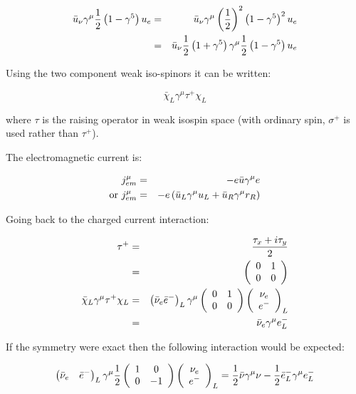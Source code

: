 \begin{eqnarray*}
  \bar{u}_{\nu}\gamma^{\mu}\frac{1}{2}\left(1 - \gamma^5\right)u_{e} & = & \bar{u}_{\nu}\gamma^{\mu}\left(\frac{1}{2}\right)^2\left(1 - \gamma^5\right)^2u_{e} \\
  & = & \bar{u}_{\nu}\frac{1}{2}\left(1 + \gamma^5\right)\gamma^{\mu}\frac{1}{2}\left(1 - \gamma^5\right)u_{e}
\end{eqnarray*}

Using the two component weak iso-spinors it can be written:

\[
  \bar{\chi}_L \gamma^{\mu}\tau^+\chi_L
\]

where $\tau$ is the raising operator in weak isospin space (with ordinary spin, $\sigma^+$ is used rather than $\tau^+$).

The electromagnetic current is:

\begin{eqnarray*}
  j^{\mu}_{em} & = & -e \bar{u}\gamma^{\mu}e \\
  \textrm{or } j^{\mu}_{em} & = & -e\left(\bar{u}_L\gamma^{\mu}u_L + \bar{u}_R\gamma^{\mu}r_R\right)
\end{eqnarray*}

Going back to the charged current interaction:

\begin{eqnarray*}
  \tau^+ & = & \frac{\tau_x + i\tau_y}{2} \\
  & = &
  \left(
  \begin{array}{cc}
    0 & 1 \\
    0 & 0
  \end{array}
  \right)
  \\
  \bar{\chi}_L\gamma^{\mu}\tau^+\chi_L & = & \left(\bar{\nu}_{e}\bar{e}^-\right)_L\gamma^{\mu}
  \left(
  \begin{array}{cc}
    0 & 1 \\
    0 & 0
  \end{array}
  \right)
  \left(
  \begin{array}{c}
    \nu_{e} \\
    e^-
  \end{array}
  \right)_L \\
  & = & \bar{\nu}_{e}\gamma^{\mu}e^-_L
\end{eqnarray*}

If the symmetry were exact then the following interaction would be expected:

\begin{eqnarray*}
  \left( \bar{\nu}_{e} \quad \bar{e}^-\right)_L \gamma^{\mu}\frac{1}{2}
  \left(
    \begin{array}{cc}
      1 & 0 \\
      0 & -1
    \end{array}
    \right)
    \left(
    \begin{array}{c}
      \nu_{e} \\
      e^-
    \end{array}
    \right)_L
    = \frac{1}{2}\bar{\nu}\gamma^{\mu}\nu - \frac{1}{2}\bar{e}^-_L\gamma^{\mu}e^-_L
\end{eqnarray*}


